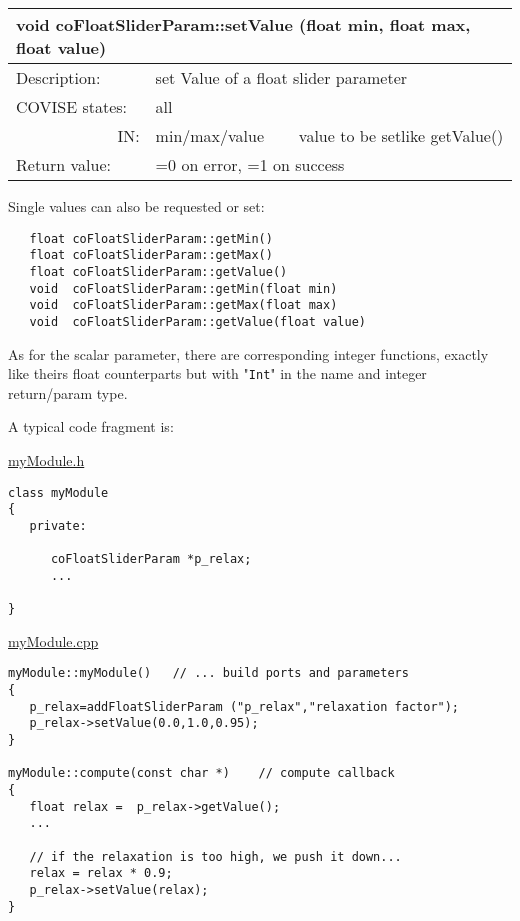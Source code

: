 \begin{longtable}{|p{4cm}|p{2.5cm}|p{7cm}|}
\hline
\multicolumn{3}{|p{13.5cm}|}{\bf void coFloatSliderParam::setValue (float min, float max, float value)} \\
\hline
{Description:}   
                  & \multicolumn{2}{|p{9.5cm}|}{set Value of a float slider parameter} \\
\hline
{COVISE states:} & \multicolumn{2}{|p{9.5cm}|}{all} \\
\hline
\multicolumn{1}{|r|}{IN:} & {min/max/value} 
                             & {value to be setlike getValue()}\\
\hline
{Return value:}  
                        & \multicolumn{2}{|p{9.5cm}|}{=0 on error, =1 on success} \endhead
\hline
\end{longtable}

Single values can also be requested or set:

\begin{verbatim}
   float coFloatSliderParam::getMin()
   float coFloatSliderParam::getMax()
   float coFloatSliderParam::getValue()
   void  coFloatSliderParam::getMin(float min)
   void  coFloatSliderParam::getMax(float max)
   void  coFloatSliderParam::getValue(float value)
\end{verbatim}

As for the scalar parameter, there are corresponding integer functions, exactly like 
theirs float counterparts but with "{\tt Int}"  in the name and integer return/param type.

A typical code fragment is:

\underline{myModule.h}

\begin{verbatim}
class myModule
{
   private:

      coFloatSliderParam *p_relax;
      ...
         
}
\end{verbatim}

\underline{myModule.cpp}

\begin{verbatim}
myModule::myModule()   // ... build ports and parameters
{
   p_relax=addFloatSliderParam ("p_relax","relaxation factor");
   p_relax->setValue(0.0,1.0,0.95);
}
 
myModule::compute(const char *)    // compute callback
{
   float relax =  p_relax->getValue();
   ...
 
   // if the relaxation is too high, we push it down...
   relax = relax * 0.9;
   p_relax->setValue(relax);
}
\end{verbatim}

